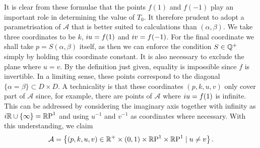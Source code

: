 \documentclass{article}
\begin{document}














It is clear from these formulae that the points $f(1)$ and $f(-1)$ play an important role in determining the value of $T_0$. It therefore prudent to adopt a parametrisation of $\mathcal{A}$ that is better suited to calculations than $(\alpha,\beta)$. We take three coordinates to be $k$, $i u = f(1)$ and $i v = f(-1)$. For the final coordinate we shall take $p=S(\alpha,\beta)$ itself, as then we can enforce the condition $S\in\mathbb{Q}^+$ simply by holding this coordinate constant. 
It is also necessary to exclude the plane where $u=v$. By the definition just given, equality is impossible since $f$ is invertible. In a limiting sense, these points correspond to the diagonal $\{\alpha=\beta\} \subset D\times D$. 
A technicality is that these coordinates $(p,k,u,v)$ only cover part of $\mathcal{A}$ since, for example, there are points of $\mathcal{A}$ where $i u = f(1)$ is infinite. This can be addressed by considering the imaginary axis together with infinity as $i\mathbb{R}\cup\{\infty\}=\mathbb{R}\text{P}^1$ and using $u^{-1}$ and $v^{-1}$ as coordinates where necessary. With this understanding, we claim
\[
\mathcal{A} = \left\{ (p,k,u,v) \in \mathbb{R}^+ \times (0,1) \times \mathbb{R}\text{P}^1\times \mathbb{R}\text{P}^1 \mid u\neq v\right\}.
\]
\end{document}
